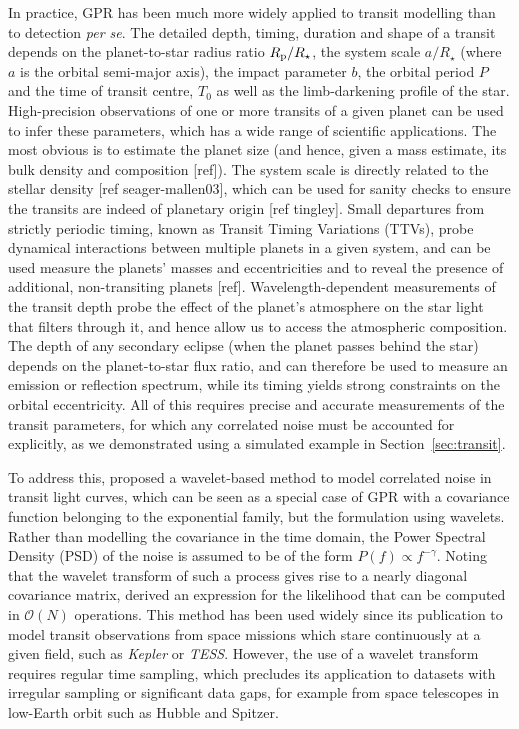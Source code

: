 \documentclass[letterpaper]{ar-1col}
\begin{document}
In practice, GPR has been much more widely applied to transit modelling than to detection \textit{per se}. The detailed depth, timing, duration and shape of a transit depends on the planet-to-star radius ratio $R_{\rm p}/R_\star$, the system scale $a/R_\star$ (where $a$ is the orbital semi-major axis), the impact parameter $b$, the orbital period $P$ and the time of transit centre, $T_0$ as well as the limb-darkening profile of the star. High-precision observations of one or more transits of a given planet can be used to infer these parameters, which has a wide range of scientific applications. The most obvious is to estimate the planet size (and hence, given a mass estimate, its bulk density and composition [ref]). The system scale is directly related to the stellar density [ref seager-mallen03], which can be used for sanity checks to ensure the transits are indeed of planetary origin [ref tingley]. Small departures from strictly periodic timing, known as Transit Timing Variations (TTVs), probe dynamical interactions between multiple planets in a given system, and can be used measure the planets' masses and eccentricities and to reveal the presence of additional, non-transiting planets [ref]. Wavelength-dependent measurements of the transit depth probe the effect of the planet's atmosphere on the star light that filters through it, and hence allow us to access the atmospheric composition. The depth of any secondary eclipse (when the planet passes behind the star) depends on the planet-to-star flux ratio, and can therefore be used to measure an emission or reflection spectrum, while its timing yields strong constraints on the orbital eccentricity. All of this requires precise and accurate measurements of the transit parameters, for which any correlated noise must be accounted for explicitly, as we demonstrated using a simulated example in Section~\ref{sec:transit}.


To address this, \citet{2009ApJ...704...51C} proposed a wavelet-based method to model correlated noise in transit light curves, which can be seen as a special case of GPR with a covariance function belonging to the exponential family, but the formulation using wavelets. Rather than modelling the covariance in the time domain, the Power Spectral Density (PSD) of the noise is assumed to be of the form $P(f) \propto f^{-\gamma}$.
Noting that the wavelet transform of such a process gives rise to a nearly diagonal covariance matrix, \citet{2009ApJ...704...51C}  derived an expression for the likelihood that can be computed in $\mathcal{O}(N)$ operations. This method has been used widely since its publication to model transit observations from space missions which stare continuously at a given field, such as \textit{Kepler} or \textit{TESS}. However, the use of a wavelet transform requires regular time sampling, which precludes its application to datasets with irregular sampling or significant data gaps, for example from space telescopes in low-Earth orbit such as Hubble and Spitzer.
\begin{armarginnote}
\end{armarginnote}
\end{document}
